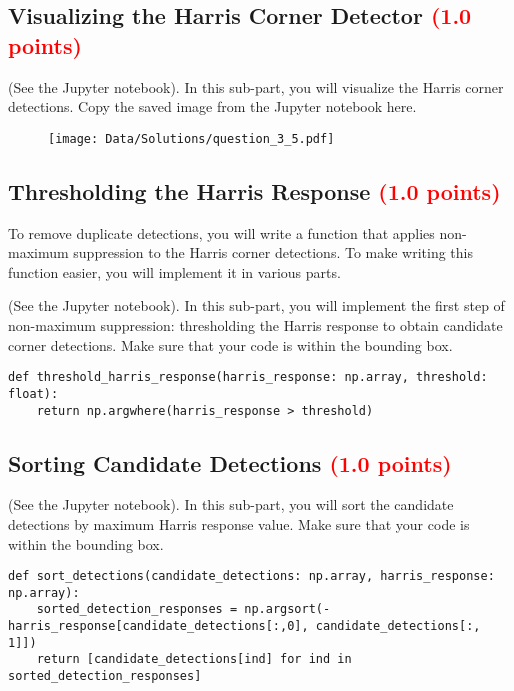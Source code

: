 \documentclass[answers]{exam}
\newcommand{\mypoints}[1]{\textcolor{red}{(#1 points)}}
\begin{document}
\subsection{Visualizing the Harris Corner Detector \mypoints{1.0}}
(See the Jupyter notebook). In this sub-part, you will visualize the Harris corner detections. Copy the saved image from the Jupyter notebook here.

\begin{solution}
\begin{figure}[H]
    \centering
    \texttt{[image: Data/Solutions/question\_3\_5.pdf]}
\end{figure}
\end{solution}

\subsection{Thresholding the Harris Response \mypoints{1.0}}
To remove duplicate detections, you will write a function that applies non-maximum suppression to the Harris corner detections. To make writing this function easier, you will implement it in various parts.

(See the Jupyter notebook). In this sub-part, you will implement the first step of non-maximum suppression: thresholding the Harris response to obtain candidate corner detections. Make sure that your code is within the bounding box.

\begin{solution}
\begin{verbatim}
def threshold_harris_response(harris_response: np.array, threshold: float):
    return np.argwhere(harris_response > threshold)
\end{verbatim}
\end{solution}

\subsection{Sorting Candidate Detections \mypoints{1.0}}
(See the Jupyter notebook). In this sub-part, you will sort the candidate detections by maximum Harris response value. Make sure that your code is within the bounding box.

\begin{solution}
\begin{verbatim}
def sort_detections(candidate_detections: np.array, harris_response: np.array):
    sorted_detection_responses = np.argsort(-harris_response[candidate_detections[:,0], candidate_detections[:, 1]])
    return [candidate_detections[ind] for ind in sorted_detection_responses]
\end{verbatim}
\end{solution}
\end{document}
